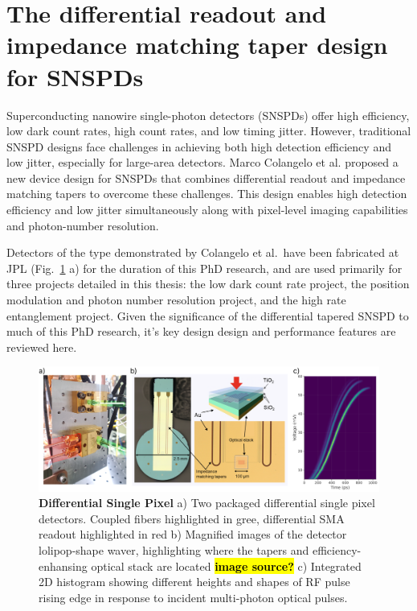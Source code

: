 \documentclass[11pt]{caltech_thesis} %
\begin{document}
\hypertarget{the-differential-readout-and-impedance-matching-taper-design-for-snspds}{%
\section{The differential readout and impedance matching taper design for SNSPDs}\label{the-differential-readout-and-impedance-matching-taper-design-for-snspds}}

Superconducting nanowire single-photon detectors (SNSPDs) offer high efficiency, low dark count rates, high count rates, and low timing jitter. However, traditional SNSPD designs face challenges in achieving both high detection efficiency and low jitter, especially for large-area detectors. Marco Colangelo et al. \autocite{Colangelo2023} proposed a new device design for SNSPDs that combines differential readout and impedance matching tapers to overcome these challenges. This design enables high detection efficiency and low jitter simultaneously along with pixel-level imaging capabilities and photon-number resolution.

Detectors of the type demonstrated by Colangelo et al.~have been fabricated at JPL (Fig.~\ref{fig:diff} a) for the duration of this PhD research, and are used primarily for three projects detailed in this thesis: the low dark count rate project, the position modulation and photon number resolution project, and the high rate entanglement project. Given the significance of the differential tapered SNSPD to much of this PhD research, it's key design design and performance features are reviewed here.

\hypertarget{fig:diff}{%
\begin{figure}
\centering
\includegraphics{./chapter_01/figs/diff_light.png}
\caption[{Differential Single Pixel}]{\textbf{Differential Single Pixel} a) Two packaged differential single pixel detectors. Coupled fibers highlighted in gree, differential SMA readout highlighted in red b) Magnified images of the detector lolipop-shape waver, highlighting where the tapers and efficiency-enhansing optical stack are located \textbf{\hl{image source?}} c) Integrated 2D histogram showing different heights and shapes of RF pulse rising edge in response to incident multi-photon optical pulses.}
\label{fig:diff}
\end{figure}
}
\end{document}
